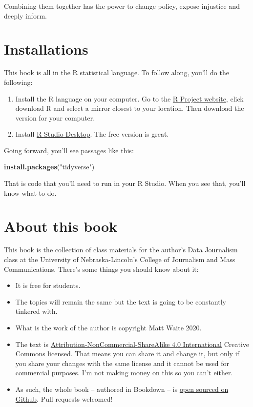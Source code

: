 \documentclass[]{book}
\newenvironment{Shaded}{\begin{snugshade}}{\end{snugshade}}
\newcommand{\KeywordTok}[1]{\textcolor[rgb]{0.13,0.29,0.53}{\textbf{#1}}}
\newcommand{\NormalTok}[1]{#1}
\newcommand{\StringTok}[1]{\textcolor[rgb]{0.31,0.60,0.02}{#1}}
\providecommand{\tightlist}{%
  \setlength{\itemsep}{0pt}\setlength{\parskip}{0pt}}
\begin{document}
Combining them together has the power to change policy, expose injustice and deeply inform.

\hypertarget{installations}{%
\section{Installations}\label{installations}}

This book is all in the R statistical language. To follow along, you'll do the following:

\begin{enumerate}
\def\labelenumi{\arabic{enumi}.}
\item
  Install the R language on your computer. Go to the \href{https://www.r-project.org/}{R Project website}, click download R and select a mirror closest to your location. Then download the version for your computer.
\item
  Install \href{https://www.rstudio.com/products/rstudio/\#Desktop}{R Studio Desktop}. The free version is great.
\end{enumerate}

Going forward, you'll see passages like this:

\begin{Shaded}
\begin{Highlighting}[]
\KeywordTok{install.packages}\NormalTok{(}\StringTok{"tidyverse"}\NormalTok{)}
\end{Highlighting}
\end{Shaded}

That is code that you'll need to run in your R Studio. When you see that, you'll know what to do.

\hypertarget{about-this-book}{%
\section{About this book}\label{about-this-book}}

This book is the collection of class materials for the author's Data Journalism class at the University of Nebraska-Lincoln's College of Journalism and Mass Communications. There's some things you should know about it:

\begin{itemize}
\tightlist
\item
  It is free for students.
\item
  The topics will remain the same but the text is going to be constantly tinkered with.
\item
  What is the work of the author is copyright Matt Waite 2020.
\item
  The text is \href{https://creativecommons.org/licenses/by-nc-sa/4.0/}{Attribution-NonCommercial-ShareAlike 4.0 International} Creative Commons licensed. That means you can share it and change it, but only if you share your changes with the same license and it cannot be used for commercial purposes. I'm not making money on this so you can't either.\\
\item
  As such, the whole book -- authored in Bookdown -- is \href{https://github.com/mattwaite/datajournalismbook}{open sourced on Github}. Pull requests welcomed!
\end{itemize}
\end{document}
